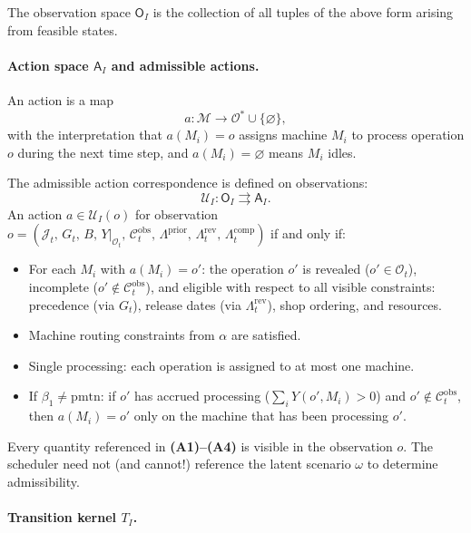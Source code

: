 The observation space $\mathsf{O}_I$ is the collection of all tuples of the above form
arising from feasible states.

\paragraph{Action space $\mathsf{A}_I$ and admissible actions.}

An action is a map
\[
a : \mathcal{M} \to \mathcal{O}^* \cup \{\varnothing\},
\]
with the interpretation that $a(M_i) = o$ assigns machine $M_i$ to process operation $o$
during the next time step, and $a(M_i) = \varnothing$ means $M_i$ idles.

The admissible action correspondence is defined on observations:
\[
\mathcal{U}_I : \mathsf{O}_I \rightrightarrows \mathsf{A}_I.
\]
An action $a \in \mathcal{U}_I(o)$ for observation
$o = (\mathcal{J}_t,\, G_t,\, B,\, Y|_{\mathcal{O}_t},\,
\mathcal{C}_t^{\mathrm{obs}},\, \Lambda^{\mathrm{prior}},\,
\Lambda_t^{\mathrm{rev}},\, \Lambda_t^{\mathrm{comp}})$ if and only if:
\begin{itemize}
    \item[\textbf{(A1)}] For each $M_i$ with $a(M_i) = o'$: the operation $o'$ is
    revealed ($o' \in \mathcal{O}_t$), incomplete
    ($o' \notin \mathcal{C}_t^{\mathrm{obs}}$), and eligible with respect to all
    visible constraints: precedence (via $G_t$), release dates (via
    $\Lambda_t^{\mathrm{rev}}$), shop ordering, and resources.

    \item[\textbf{(A2)}] Machine routing constraints from $\alpha$ are satisfied.

    \item[\textbf{(A3)}] Single processing: each operation is assigned to at most one
    machine.

    \item[\textbf{(A4)}] If $\beta_1 \neq \mathrm{pmtn}$: if $o'$ has accrued
    processing ($\sum_i Y(o', M_i) > 0$) and
    $o' \notin \mathcal{C}_t^{\mathrm{obs}}$, then $a(M_i) = o'$ only on the machine
    that has been processing $o'$.
\end{itemize}
Every quantity referenced in \textbf{(A1)--(A4)} is visible in the observation $o$. The
scheduler need not (and cannot!) reference the latent scenario $\omega$ to determine
admissibility.

\paragraph{Transition kernel $T_I$.}

